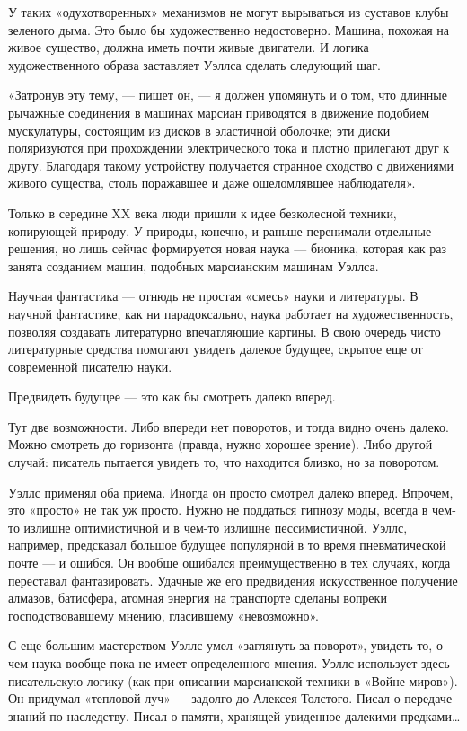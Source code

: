 У таких «одухотворенных» механизмов не могут вырываться из суставов  клубы
зеленого дыма. Это было бы художественно недостоверно. Машина, похожая  на
живое  существо,   должна   иметь   почти  живые   двигатели.   И   логика
художественного образа заставляет Уэллса сделать следующий шаг.

«Затронув эту тему, — пишет он, — я должен упомянуть и о том, что  длинные
рычажные соединения  в  машинах  марсиан приводятся  в  движение  подобием
мускулатуры,  состоящим  из  дисков  в  эластичной  оболочке;  эти   диски
поляризуются при прохождении электрического тока и плотно прилегают друг к
другу.  Благодаря  такому  устройству   получается  странное  сходство   с
движениями  живого  существа,   столь  поражавшее   и  даже   ошеломлявшее
наблюдателя».

Только в  середине  XX  века  люди  пришли  к  идее  безколесной  техники,
копирующей природу.  У природы,  конечно,  и раньше  перенимали  отдельные
решения, но лишь сейчас формируется новая наука — бионика, которая как раз
занята созданием машин, подобных марсианским машинам Уэллса.

Научная фантастика  — отнюдь  не  простая «смесь»  науки и  литературы.  В
научной   фантастике,   как   ни   парадоксально,   наука   работает    на
художественность, позволяя создавать  литературно впечатляющие картины.  В
свою очередь чисто литературные средства помогают увидеть далекое будущее,
скрытое еще от современной писателю науки.

Предвидеть будущее — это как бы смотреть далеко вперед.

Тут две  возможности. Либо  впереди  нет поворотов,  и тогда  видно  очень
далеко. Можно смотреть до горизонта  (правда, нужно хорошее зрение).  Либо
другой случай: писатель пытается увидеть то, что находится близко, но за
поворотом.

Уэллс применял  оба  приема.  Иногда  он  просто  смотрел  далеко  вперед.
Впрочем, это «просто» не так уж  просто. Нужно не поддаться гипнозу  моды,
всегда в чем-то излишне оптимистичной  и в чем-то излишне  пессимистичной.
Уэллс,  например,  предсказал  большое  будущее  популярной  в  то   время
пневматической почте — и ошибся. Он вообще ошибался преимущественно в  тех
случаях,  когда  переставал  фантазировать.  Удачные  же  его  предвидения
искусственное   получение   алмазов,   батисфера,   атомная   энергия   на
транспорте сделаны    вопреки    господствовавшему    мнению,    гласившему
«невозможно».

С еще большим мастерством Уэллс умел «заглянуть за поворот», увидеть то, о
чем наука  вообще пока  не имеет  определенного мнения.  Уэллс  использует
здесь писательскую логику (как при  описании марсианской техники в  «Войне
миров»). Он придумал «тепловой луч» — задолго до Алексея Толстого. Писал о
передаче знаний по наследству. Писал о памяти, хранящей увиденное далекими
предками…

